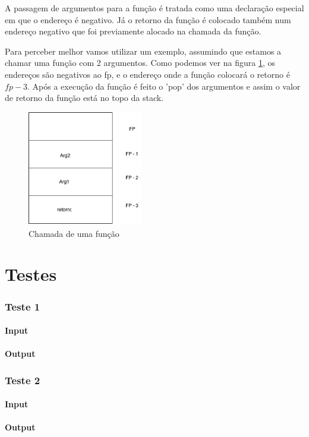 \documentclass[a4paper,10pt]{report}
\begin{document}
A passagem de argumentos para a função é tratada como uma declaração especial em que o endereço é negativo.
Já o retorno da função é colocado também num endereço negativo que foi previamente alocado na chamada da função.

Para perceber melhor vamos utilizar um exemplo, assumindo que estamos a chamar uma função com 2 argumentos.
Como podemos ver na figura \ref{fig:functionStack}, os endereços são negativos ao fp, e o endereço onde a função colocará o retorno é $fp - 3$.
Após a execução da função é feito o 'pop' dos argumentos e assim o valor de retorno da função está no topo da stack. 

\begin{figure}
\centering
\includegraphics[width=5cm]{functionStack.png}
\caption{Chamada de uma função}
\label{fig:functionStack}
\end{figure}

\chapter{Testes}
\subsection{Teste 1}
\subsubsection{Input}
\subsubsection{Output}


\subsection{Teste 2}
\subsubsection{Input}
\subsubsection{Output}
\end{document}
